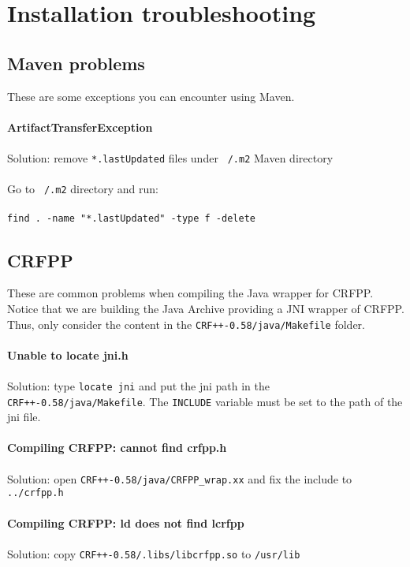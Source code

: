 \documentclass{wileysev}
\begin{document}
\section[Installation troubleshooting]{Installation troubleshooting}
\subsection[Maven problems]{Maven problems}

These are some exceptions you can encounter using Maven. 
\\\\
\textbf{ArtifactTransferException}
\\\\
Solution: remove \texttt{*.lastUpdated} files under \texttt{~/.m2} Maven directory
\\\\
Go to \texttt{~/.m2} directory and run:
\\\\
\texttt{find . -name "*.lastUpdated" -type f -delete}


\subsection[CRFPP]{CRFPP}

These are common problems when compiling the Java wrapper for CRFPP. Notice that we are building the Java Archive providing a JNI wrapper of CRFPP. Thus, only consider the content in the \texttt{CRF++-0.58/java/Makefile} folder.
\\\\
\textbf{Unable to locate jni.h}
\\\\
Solution: type \texttt{locate jni} and put the jni path in the \texttt{CRF++-0.58/java/Makefile}. The \texttt{INCLUDE} variable must be set to the path of the jni file.
\\\\
\textbf{Compiling CRFPP: cannot find crfpp.h}
\\\\
Solution: open \texttt{CRF++-0.58/java/CRFPP\_wrap.xx} and fix the include to \texttt{../crfpp.h}
\\\\
\textbf{Compiling CRFPP: ld does not find lcrfpp}
\\\\
Solution: copy \texttt{CRF++-0.58/.libs/libcrfpp.so} to \texttt{/usr/lib}
\end{document}
